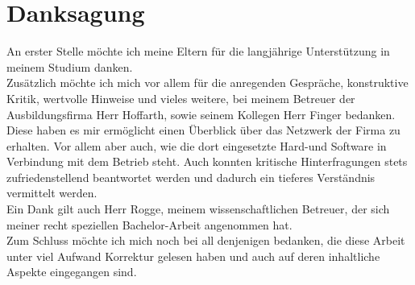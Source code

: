 \section*{Danksagung}
\label{sec:Dank}

An erster Stelle möchte ich meine Eltern für die langjährige Unterstützung in meinem Studium danken.\\
Zusätzlich möchte ich mich vor allem für die anregenden Gespräche, konstruktive Kritik, wertvolle Hinweise und vieles weitere, bei meinem Betreuer der Ausbildungsfirma Herr Hoffarth, sowie seinem Kollegen Herr Finger bedanken. Diese haben es mir ermöglicht einen Überblick über das Netzwerk der Firma zu erhalten. Vor allem aber auch, wie die dort eingesetzte Hard-und Software in Verbindung mit dem Betrieb steht. Auch konnten kritische Hinterfragungen stets zufriedenstellend beantwortet werden und dadurch ein tieferes Verständnis vermittelt werden.\\
Ein Dank gilt auch Herr Rogge, meinem wissenschaftlichen Betreuer, der sich meiner recht speziellen Bachelor-Arbeit angenommen hat.\\
Zum Schluss möchte ich mich noch bei all denjenigen bedanken, die diese Arbeit unter viel Aufwand Korrektur gelesen haben und auch auf deren inhaltliche Aspekte eingegangen sind.\\

